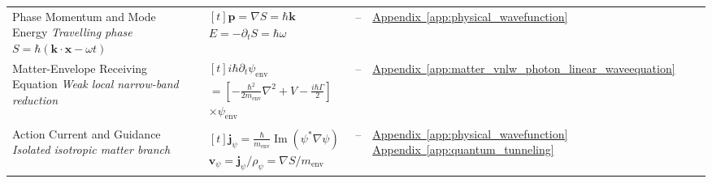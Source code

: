 \begin{longtable}{@{} p{4.5cm} p{6cm} c p{4cm} @{}}
{\raggedright Phase Momentum and Mode Energy \newline \textit{Travelling phase $S=\hbar(\mathbf k\cdot\mathbf x-\omega t)$}\par} & {\raggedright $\begin{gathered}[t]\mathbf p=\nabla S=\hbar\mathbf k \\ E=-\partial_tS=\hbar\omega\end{gathered}$\par} & -- & {\raggedright \hyperref[app:physical_wavefunction]{Appendix~\ref*{app:physical_wavefunction}}\par} \\

{\raggedright Matter-Envelope Receiving Equation \newline \textit{Weak local narrow-band reduction}\par} & {\raggedright $\begin{gathered}[t]i\hbar\partial_t\psi_{\mathrm{env}} \\ =\left[-\frac{\hbar^2}{2m_{\mathrm{env}}}\nabla^2+V-\frac{i\hbar\Gamma}{2}\right] \\ \times\psi_{\mathrm{env}}\end{gathered}$\par} & -- & {\raggedright \hyperref[app:matter_vnlw_photon_linear_waveequation]{Appendix~\ref*{app:matter_vnlw_photon_linear_waveequation}}\par} \\

{\raggedright Action Current and Guidance \newline \textit{Isolated isotropic matter branch}\par} & {\raggedright $\begin{gathered}[t]\mathbf j_\psi=\frac{\hbar}{m_{\mathrm{env}}}\operatorname{Im}(\psi^*\nabla\psi) \\ \mathbf v_\psi=\mathbf j_\psi/\rho_\psi=\nabla S/m_{\mathrm{env}}\end{gathered}$\par} & -- & {\raggedright \hyperref[app:physical_wavefunction]{Appendix~\ref*{app:physical_wavefunction}} \newline \hyperref[app:quantum_tunneling]{Appendix~\ref*{app:quantum_tunneling}}\par} \\


\end{longtable}
